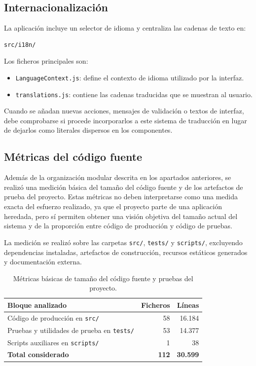 \subsection{Internacionalización}

La aplicación incluye un selector de idioma y centraliza las cadenas de texto en:

\begin{verbatim}
src/i18n/
\end{verbatim}

Los ficheros principales son:

\begin{itemize}
\item \texttt{LanguageContext.js}: define el contexto de idioma utilizado por la interfaz.

\item \texttt{translations.js}: contiene las cadenas traducidas que se muestran al usuario.

\end{itemize}

Cuando se añadan nuevas acciones, mensajes de validación o textos de interfaz, debe comprobarse si procede incorporarlos a este sistema de traducción en lugar de dejarlos como literales dispersos en los componentes.

\subsection{Métricas del código fuente}

Además de la organización modular descrita en los apartados anteriores, se realizó una medición básica del tamaño del código fuente y de los artefactos de prueba del proyecto. Estas métricas no deben interpretarse como una medida exacta del esfuerzo realizado, ya que el proyecto parte de una aplicación heredada, pero sí permiten obtener una visión objetiva del tamaño actual del sistema y de la proporción entre código de producción y código de pruebas.

La medición se realizó sobre las carpetas \texttt{src/}, \texttt{tests/} y \texttt{scripts/}, excluyendo dependencias instaladas, artefactos de construcción, recursos estáticos generados y documentación externa.

\begin{table}[H]
\centering
\small
\renewcommand{\arraystretch}{1.2}
\begin{tabular}{p{} r r}
\toprule
\textbf{Bloque analizado} & \textbf{Ficheros} & \textbf{Líneas} \tabularnewline
\midrule
Código de producción en \texttt{src/} & 58 & 16.184 \tabularnewline
Pruebas y utilidades de prueba en \texttt{tests/} & 53 & 14.377 \tabularnewline
Scripts auxiliares en \texttt{scripts/} & 1 & 38 \tabularnewline
\midrule
\textbf{Total considerado} & \textbf{112} & \textbf{30.599} \tabularnewline
\bottomrule
\end{tabular}
\caption{Métricas básicas de tamaño del código fuente y pruebas del proyecto.}
\label{tab:metricas_codigo_fuente}
\end{table}

